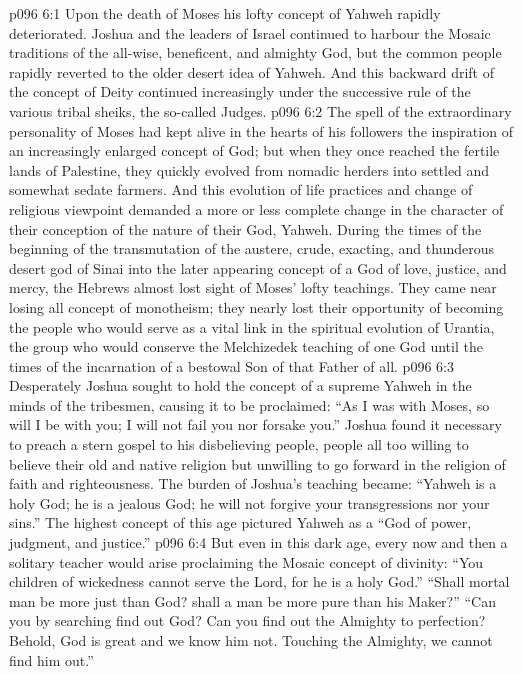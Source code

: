 \vs p096 6:1 Upon the death of Moses his lofty concept of Yahweh rapidly deteriorated. Joshua and the leaders of Israel continued to harbour the Mosaic traditions of the all\hyp{}wise, beneficent, and almighty God, but the common people rapidly reverted to the older desert idea of Yahweh. And this backward drift of the concept of Deity continued increasingly under the successive rule of the various tribal sheiks, the so\hyp{}called Judges.
\vs p096 6:2 The spell of the extraordinary personality of Moses had kept alive in the hearts of his followers the inspiration of an increasingly enlarged concept of God; but when they once reached the fertile lands of Palestine, they quickly evolved from nomadic herders into settled and somewhat sedate farmers. And this evolution of life practices and change of religious viewpoint demanded a more or less complete change in the character of their conception of the nature of their God, Yahweh. During the times of the beginning of the transmutation of the austere, crude, exacting, and thunderous desert god of Sinai into the later appearing concept of a God of love, justice, and mercy, the Hebrews almost lost sight of Moses’ lofty teachings. They came near losing all concept of monotheism; they nearly lost their opportunity of becoming the people who would serve as a vital link in the spiritual evolution of Urantia, the group who would conserve the Melchizedek teaching of one God until the times of the incarnation of a bestowal Son of that Father of all.
\vs p096 6:3 Desperately Joshua sought to hold the concept of a supreme Yahweh in the minds of the tribesmen, causing it to be proclaimed: “As I was with Moses, so will I be with you; I will not fail you nor forsake you.” Joshua found it necessary to preach a stern gospel to his disbelieving people, people all too willing to believe their old and native religion but unwilling to go forward in the religion of faith and righteousness. The burden of Joshua’s teaching became: “Yahweh is a holy God; he is a jealous God; he will not forgive your transgressions nor your sins.” The highest concept of this age pictured Yahweh as a “God of power, judgment, and justice.”
\vs p096 6:4 But even in this dark age, every now and then a solitary teacher would arise proclaiming the Mosaic concept of divinity: “You children of wickedness cannot serve the Lord, for he is a holy God.” “Shall mortal man be more just than God? shall a man be more pure than his Maker?” “Can you by searching find out God? Can you find out the Almighty to perfection? Behold, God is great and we know him not. Touching the Almighty, we cannot find him out.”
